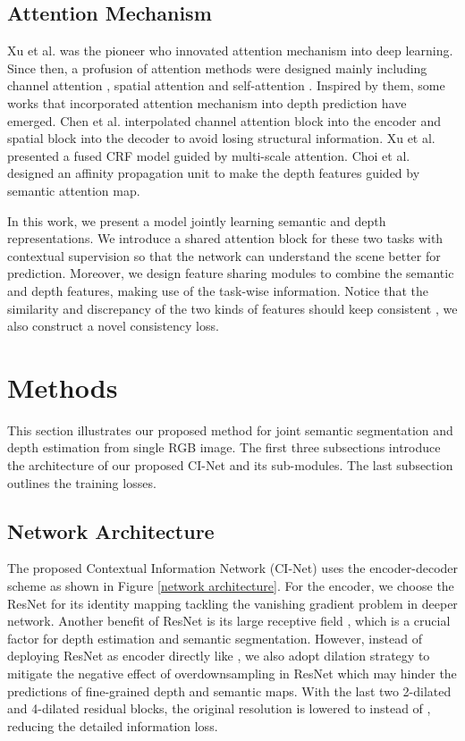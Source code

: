 \documentclass[sn-mathphys]{sn-jnl}
\theoremstyle{thmstyleone}\newtheorem{theorem}{Theorem}\newtheorem{proposition}[theorem]{Proposition}
\theoremstyle{thmstyletwo}\newtheorem{example}{Example}\newtheorem{remark}{Remark}
\theoremstyle{thmstylethree}\newtheorem{definition}{Definition}\usepackage[numbers,sort&compress]{natbib}
\begin{document}
\subsection{Attention Mechanism}
Xu et al. \cite{xu2015show} was the pioneer who innovated attention mechanism into deep learning. Since then, a profusion of attention methods were designed mainly including channel attention \cite{Hu_2018}, spatial attention \cite{jaderberg2015spatial} and self-attention \cite{Wang_2018}. Inspired by them, some works that incorporated attention mechanism into depth prediction have emerged. Chen et al. \cite{Chen_2020} interpolated channel attention block into the encoder and spatial block into the decoder to avoid losing structural information. Xu et al. \cite{Xu_2018} presented a fused CRF model guided by multi-scale attention. Choi et al. \cite{choi2020safenet} designed an affinity propagation unit to make the depth features guided by semantic attention map.

In this work, we present a model jointly learning semantic and depth representations. We introduce a shared attention block for these two tasks with contextual supervision so that the network can understand the scene better for prediction. Moreover, we design feature sharing modules to combine the semantic and depth features, making use of the task-wise information. Notice that the similarity and discrepancy of the two kinds of features should keep consistent , we also construct a novel consistency loss.

\section{Methods}\label{sec3}

This section illustrates our proposed method for joint semantic segmentation and depth estimation from single RGB image. The first three subsections introduce the architecture of our proposed CI-Net and its sub-modules. The last subsection outlines the training losses. 

\subsection{Network Architecture}
The proposed Contextual Information Network (CI-Net) uses the encoder-decoder scheme as shown in Figure \ref{network architecture}. For the encoder, we choose the ResNet \cite{He_2016} for its identity mapping tackling the vanishing gradient problem in deeper network. Another benefit of ResNet is its large receptive field \cite{Laina_2016}, which is a crucial factor for depth estimation and semantic segmentation. However, instead of deploying ResNet as encoder directly like \cite{guizilini2020semantically,Zhang_2018,choi2020safenet}, we also adopt dilation strategy \cite{Yu_2017} to mitigate the negative effect of overdownsampling in ResNet which may hinder the predictions of fine-grained depth and semantic maps. With the last two 2-dilated and 4-dilated residual blocks, the original resolution is lowered to  instead of , reducing the detailed information loss. 
\end{document}
